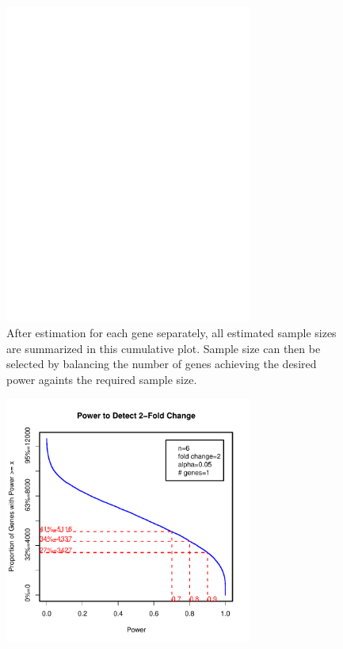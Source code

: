 \documentclass{bioinfo}
\begin{document}
\begin{figure}[h]
  \centerline{\includegraphics*[width=3.2in]{CumPlot.pdf}}
  \caption[Effect of Sample Size on Power]{
    After estimation for each gene separately, all estimated sample
    sizes are summarized in this cumulative plot. Sample size can then
    be selected by balancing the number of genes achieving the desired
    power againts the required sample size.}
  \label{fig:CumNPlot}
\end{figure} 

\begin{figure}[h]
  \centerline{\includegraphics*[width=3.2in]{CumPowerPlot.pdf}}
  \caption[Given Sample Size, Fraction of Genes Achieving a Specified Power]{}
  \label{fig:CumPowerPlot}
\end{figure}
\end{document}
